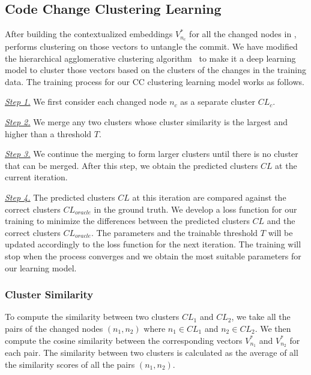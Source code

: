 
\subsection{Code Change Clustering Learning}
\label{clustering:sec}

After building the contextualized embeddings $V^{*}_{n_c}$ for all the
changed nodes in {\mvpdg}, {\tool} performs clustering on those
vectors to untangle the commit. We have modified the hierarchical
agglomerative clustering algorithm~\cite{yi} to make it a deep
learning model to cluster those vectors based on the clusters of the
changes in the training data. The training process for our CC
clustering learning model works  as follows.

{\em \underline{Step 1.}} We first consider each changed node $n_c$ as a
separate cluster $CL_c$.

{\em \underline{Step 2.}} We merge any two clusters whose cluster
similarity is the largest and higher than a threshold $T$.

{\em \underline{Step 3.}} We continue the merging to form larger
clusters until there is no cluster that can be merged. After this
step, we obtain the predicted clusters $CL$ at the current iteration.

{\em \underline{Step 4.}} The predicted clusters $CL$ at this iteration
are compared against the correct clusters $CL_{oracle}$ in the ground
truth. We develop a loss function for our training to minimize the
differences between the predicted clusters $CL$ and the correct
clusters $CL_{oracle}$. The parameters and the trainable threshold $T$
will be updated accordingly to the loss function for the next
iteration. The training will stop when the process converges and we
obtain the most suitable parameters for our learning model.

\subsubsection*{Cluster Similarity} To compute the similarity between
two clusters $CL_1$ and $CL_2$, we take all the pairs of the changed
nodes $(n_1,n_2)$ where $n_1 \in CL_1$ and $n_2 \in CL_2$. We
then compute the cosine similarity between the corresponding vectors
$V^{*}_{n_1}$ and $V^{*}_{n_2}$ for each pair. The similarity between
two clusters is calculated as the average of all the similarity scores
of all the pairs $(n_1,n_2)$.

